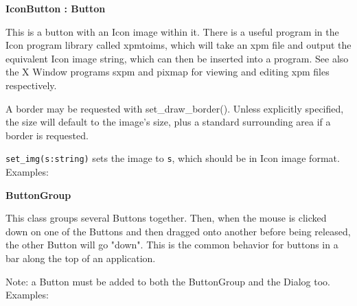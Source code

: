 {\ttfamily\bfseries
{}IconButton : Button}

This is a button with an Icon image within it. There is a useful program
in the Icon program library called xpmtoims, which will take an xpm
file and output the equivalent Icon image string, which can then be
inserted into a program. See also the X Window programs sxpm and pixmap
for viewing and editing xpm files respectively.

A border may be requested with set\_draw\_border(). Unless explicitly
specified, the size will default to the image's size,
plus a standard surrounding area if a border is requested.

\texttt{set\_img(s:string)} sets the image to \texttt{s}, which should
be in Icon image format. Examples:


{\ttfamily\bfseries
{}ButtonGroup}

This class groups several Buttons together. Then, when the mouse is
clicked down on one of the Buttons and then dragged onto another before
being released, the other Button will go
"down". This is the common behavior for
buttons in a bar along the top of an application.

Note: a Button must be added to both the ButtonGroup and the Dialog too.
Examples:


